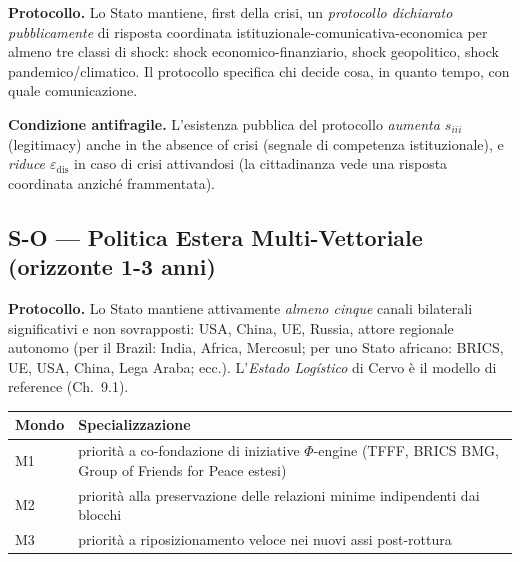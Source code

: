 \Hypoth{} \textbf{Protocollo.} Lo Stato mantiene, first della crisi, un
\emph{protocollo dichiarato pubblicamente} di risposta coordinata
istituzionale-comunicativa-economica per almeno tre classi di shock:
shock economico-finanziario, shock geopolitico, shock
pandemico/climatico. Il protocollo specifica chi decide cosa, in quanto
tempo, con quale comunicazione.

\Proved{} \textbf{Condizione antifragile.} L'esistenza pubblica del
protocollo \emph{aumenta \(s_{iii}\)} (legitimacy) anche in the absence of
crisi (segnale di competenza istituzionale), e \emph{riduce
\(\varepsilon_{\text{dis}}\)} in caso di crisi attivandosi (la
cittadinanza vede una risposta coordinata anziché frammentata).

\subsection{S-O --- Politica Estera Multi-Vettoriale (orizzonte 1-3
anni)}\label{s-o-politica-estera-multi-vettoriale-orizzonte-1-3-anni}

\Hypoth{} \textbf{Protocollo.} Lo Stato mantiene attivamente
\emph{almeno cinque} canali bilaterali significativi e non sovrapposti:
USA, China, UE, Russia, attore regionale autonomo (per il Brazil: India,
Africa, Mercosul; per uno Stato africano: BRICS, UE, USA, China, Lega
Araba; ecc.). L'\emph{Estado Logístico} di Cervo è il modello di
reference (Ch.~9.1).

{\def\LTcaptype{none} %
{\small\begin{longtable}[]{@{}
  >{\raggedright\arraybackslash}p{}
  >{\raggedright\arraybackslash}p{}@{}}
\toprule\noalign{}
\begin{minipage}[b]{\linewidth}\raggedright
Mondo
\end{minipage} & \begin{minipage}[b]{\linewidth}\raggedright
Specializzazione
\end{minipage} \\
\midrule\noalign{}
\endhead
\bottomrule\noalign{}
\endlastfoot
M1 & priorità a co-fondazione di iniziative \(\Phi\)-engine (TFFF, BRICS
BMG, Group of Friends for Peace estesi) \\
M2 & priorità alla preservazione delle relazioni minime indipendenti dai
blocchi \\
M3 & priorità a riposizionamento veloce nei nuovi assi post-rottura \\
\end{longtable}}
}

